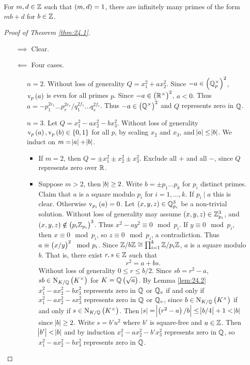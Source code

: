 \begin{theorem}
For $ m, d \in \mathbb{Z} $ such that $ \br{m, d} = 1 $, there are infinitely many primes of the form $ mb + d $ for $ b \in \mathbb{Z} $.
\end{theorem}

\begin{proof}[Proof of Theorem \ref{thm:24.1}]
\hfill
\begin{itemize}
\item[$ \implies $] Clear.
\item[$ \impliedby $] Four cases.
\begin{itemize}[leftmargin=0.5in]
\item[$ n = 2 $.] Without loss of generality $ Q = x_1^2 + ax_2^2 $. Since $ -a \in \br{\QQ_p^\times}^2 $, $ \v_p\br{a} $ is even for all primes $ p $. Since $ -a \in \br{\RR^\times}^2 $, $ a < 0 $. Thus $ a = -p_1^{2e_1} \dots p_r^{2e_r} / q_1^{2f_1} \dots q_s^{2f_s} $. Thus $ -a \in \br{\QQ^\times}^2 $ and $ Q $ represents zero in $ \mathbb{Q} $.
\item[$ n = 3 $.] Let $ Q = x_1^2 - ax_2^2 - bx_3^2 $. Without loss of generality $ \v_p\br{a}, \v_p\br{b} \in \cbr{0, 1} $ for all $ p $, by scaling $ x_2 $ and $ x_3 $, and $ \abs{a} \le \abs{b} $. We induct on $ m = \abs{a} + \abs{b} $.
\begin{itemize}
\item If $ m = 2 $, then $ Q = \pm x_1^2 \pm x_2^2 \pm x_3^2 $. Exclude all $ + $ and all $ - $, since $ Q $ represents zero over $ \mathbb{R} $.
\item Suppose $ m > 2 $, then $ \abs{b} \ge 2 $. Write $ b = \pm p_1 \dots p_k $ for $ p_i $ distinct primes. Claim that $ a $ is a square modulo $ p_i $ for $ i = 1, \dots, k $. If $ p_i \mid a $ this is clear. Otherwise $ \v_{p_i}\br{a} = 0 $. Let $ \br{x, y, z} \in \QQ_{p_i}^3 $ be a non-trivial solution. Without loss of generality may assume $ \br{x, y, z} \in \ZZ_{p_i}^3 $, and $ \br{x, y, z} \notin \br{p_i\ZZ_{p_i}}^3 $. Thus $ x^2 - ay^2 \equiv 0 \mod p_i $. If $ y \equiv 0 \mod p_i $, then $ x \equiv 0 \mod p_i $, so $ z \equiv 0 \mod p_i $, a contradiction. Thus $ a \equiv \br{x / y}^2 \mod p_i $. Since $ \mathbb{Z} / b\mathbb{Z} \cong \prod_{i = 1}^k \mathbb{Z} / p_i\mathbb{Z} $, $ a $ is a square modulo $ b $. That is, there exist $ r, s \in \mathbb{Z} $ such that
$$ r^2 = a + bs. $$
Without loss of generality $ 0 \le r \le b / 2 $. Since $ sb = r^2 - a $, $ sb \in \N_{K / \QQ}\br{K^\times} $ for $ K = \QQ\br{\sqrt{a}} $. By Lemma \ref{lem:24.2} $ x_1^2 - ax_2^2 - bx_3^2 $ represents zero in $ \mathbb{Q} $ or $ \mathbb{Q}_v $ if and only if $ x_1^2 - ax_2^2 - sx_3^2 $ represents zero in $ \mathbb{Q} $ or $ \mathbb{Q}_v $, since $ b \in \N_{K / \QQ}\br{K^\times} $ if and only if $ s \in \N_{K / \QQ}\br{K^\times} $. Then $ \abs{s} = \abs{\br{r^2 - a} / b} \le \abs{b / 4} + 1 < \abs{b} $ since $ \abs{b} \ge 2 $. Write $ s = b'u^2 $ where $ b' $ is square-free and $ u \in \mathbb{Z} $. Then $ \abs{b'} < \abs{b} $ and by induction $ x_1^2 - ax_2^2 - b'x_3^2 $ represents zero in $ \mathbb{Q} $, so $ x_1^2 - ax_2^2 - bx_3^2 $ represents zero in $ \mathbb{Q} $.
\end{itemize}


\end{itemize}
\end{itemize}
\end{proof}
